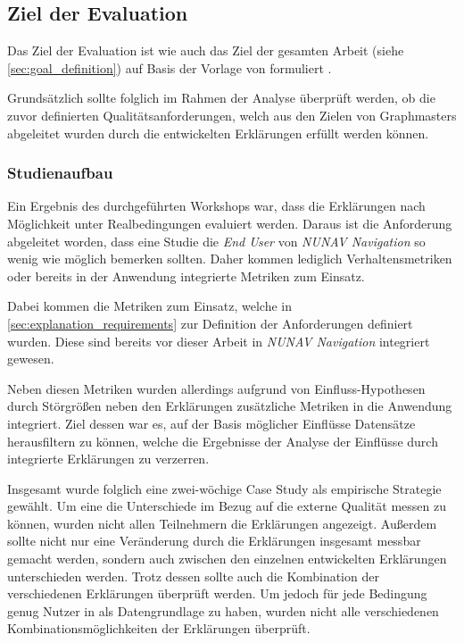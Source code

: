 \subsection{Ziel der Evaluation}

Das Ziel der Evaluation ist wie auch das Ziel der gesamten Arbeit (siehe \autoref{sec:goal_definition}) auf Basis der Vorlage von \citeauthor{wohlin2012experimentation} formuliert \cite{wohlin2012experimentation}.

\smallskip

\noindent{}

\smallskip

Grundsätzlich sollte folglich im Rahmen der Analyse überprüft werden, ob die zuvor definierten Qualitätsanforderungen, welch aus den Zielen von Graphmasters abgeleitet wurden durch die entwickelten Erklärungen erfüllt werden können.

\subsubsection{Studienaufbau}

Ein Ergebnis des durchgeführten Workshops war, dass die Erklärungen nach Möglichkeit unter Realbedingungen evaluiert werden. Daraus ist die Anforderung abgeleitet worden, dass eine Studie die \textit{End User} von \textit{NUNAV Navigation} so wenig wie möglich bemerken sollten. Daher kommen lediglich Verhaltensmetriken oder bereits in der Anwendung integrierte Metriken zum Einsatz.

Dabei kommen die Metriken zum Einsatz, welche in \autoref{sec:explanation_requirements} zur Definition der Anforderungen definiert wurden. Diese sind bereits vor dieser Arbeit in \textit{NUNAV Navigation} integriert gewesen.

Neben diesen Metriken wurden allerdings aufgrund von Einfluss-Hypothesen durch Störgrößen neben den Erklärungen zusätzliche Metriken in die Anwendung integriert. Ziel dessen war es, auf der Basis möglicher Einflüsse Datensätze herausfiltern zu können, welche die Ergebnisse der Analyse der Einflüsse durch integrierte Erklärungen zu verzerren.

Insgesamt wurde folglich eine zwei-wöchige Case Study als empirische Strategie gewählt. Um eine die Unterschiede im Bezug auf die externe Qualität messen zu können, wurden nicht allen Teilnehmern die Erklärungen angezeigt. Außerdem sollte nicht nur eine Veränderung durch die Erklärungen insgesamt messbar gemacht werden, sondern auch zwischen den einzelnen entwickelten Erklärungen unterschieden werden. Trotz dessen sollte auch die Kombination der verschiedenen Erklärungen überprüft werden. Um jedoch für jede Bedingung genug Nutzer in als Datengrundlage zu haben, wurden nicht alle verschiedenen Kombinationsmöglichkeiten der Erklärungen überprüft.

